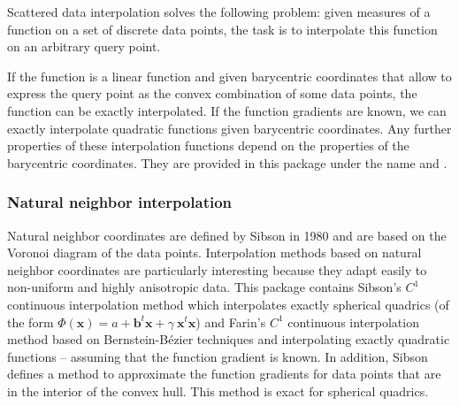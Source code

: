 
\label{chap:Interpolation}

Scattered data interpolation solves the following problem: given
measures of a function on a set of discrete data points, the task is
to interpolate this function on an arbitrary query point.

If the function is a linear function and given barycentric coordinates
that allow to express the query point as the convex combination of
some data points, the function can be exactly interpolated. If the
function gradients are known, we can exactly interpolate quadratic
functions given barycentric coordinates. Any further properties of
these interpolation functions depend on the properties of the
barycentric coordinates. They are provided in this package under the
name  and
.\medskip

\subsubsection*{Natural neighbor interpolation} 

Natural neighbor
coordinates are defined by Sibson in 1980 and are based on the Voronoi
diagram of the data points. Interpolation methods based on natural
neighbor coordinates are particularly interesting because they adapt
easily to non-uniform and highly anisotropic data.  This package
contains Sibson's $C^1$ continuous interpolation method which
interpolates exactly spherical quadrics (of the form $\Phi(\mathbf{x})
=a + \mathbf{b}^t \mathbf{x} +\gamma\ \mathbf{x}^t\mathbf{x}$) and
Farin's $C^1$ continuous interpolation method based on
Bernstein-B\'ezier techniques and interpolating exactly quadratic
functions -- assuming that the function gradient is known. In
addition, Sibson defines a method to approximate the function
gradients for data points that are in the interior of the convex hull.
This
method is exact for spherical quadrics.%

